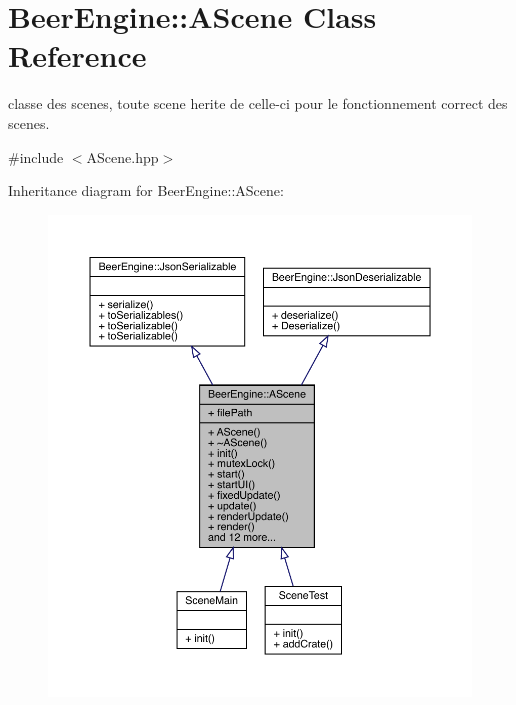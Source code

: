 \hypertarget{class_beer_engine_1_1_a_scene}{}\section{Beer\+Engine\+:\+:A\+Scene Class Reference}
\label{class_beer_engine_1_1_a_scene}


classe des scenes, toute scene herite de celle-\/ci pour le fonctionnement correct des scenes.  




{\ttfamily \#include $<$A\+Scene.\+hpp$>$}



Inheritance diagram for Beer\+Engine\+:\+:A\+Scene\+:\nopagebreak
\begin{figure}[H]
\begin{center}
\leavevmode
\includegraphics[width=350pt]{class_beer_engine_1_1_a_scene__inherit__graph}
\end{center}
\end{figure}


